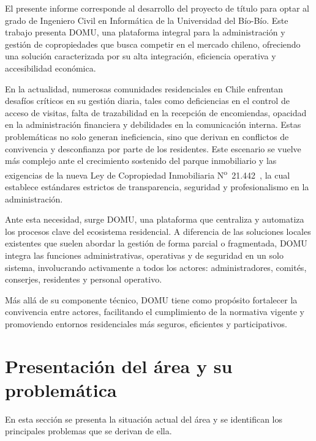 
El presente informe corresponde al desarrollo del  proyecto de título para optar al grado de Ingeniero Civil en Informática de la Universidad del Bío-Bío. Este trabajo presenta DOMU, una plataforma integral para la administración y gestión de copropiedades que busca competir en el mercado chileno, ofreciendo una solución caracterizada por su alta integración, eficiencia operativa y accesibilidad económica.

En la actualidad, numerosas comunidades residenciales en Chile enfrentan desafíos críticos en su gestión diaria, tales como deficiencias en el control de acceso de visitas, falta de trazabilidad en la recepción de encomiendas, opacidad en la administración financiera y debilidades en la comunicación interna. Estas problemáticas no solo generan ineficiencia, sino que derivan en conflictos de convivencia y desconfianza por parte de los residentes. Este escenario se vuelve más complejo ante el crecimiento sostenido del parque inmobiliario y las exigencias de la nueva Ley de Copropiedad Inmobiliaria N\textsuperscript{o}~21.442~\cite{ley21442}, la cual establece estándares estrictos de transparencia, seguridad y profesionalismo en la administración.

Ante esta necesidad, surge DOMU, una plataforma que centraliza y automatiza los procesos clave del ecosistema residencial. A diferencia de las soluciones locales existentes que suelen abordar la gestión de forma parcial o fragmentada, DOMU integra las funciones administrativas, operativas y de seguridad en un solo sistema, involucrando activamente a todos los actores: administradores, comités, conserjes, residentes y personal operativo.

Más allá de su componente técnico, DOMU tiene como propósito fortalecer la convivencia entre actores, facilitando el cumplimiento de la normativa vigente y promoviendo entornos residenciales más seguros, eficientes y participativos.


\newpage
\section{Presentación del área y su problemática}
En esta sección se presenta la situación actual del área y se identifican los principales problemas que se derivan de ella.


